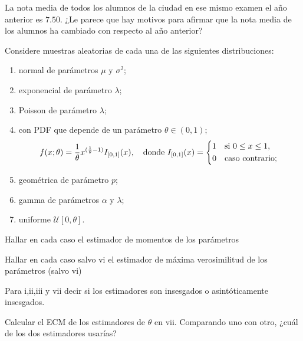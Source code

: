 \documentclass[a4paper,oneside,fleqn,11pt]{article}
\begin{document}
\begin{ejercicios}
\begin{ejitems}
    \item La nota media de todos los alumnos de la ciudad en ese mismo examen el año anterior es $7.50$. ¿Le parece que hay motivos para afirmar que la nota media de los alumnos ha cambiado con respecto al año anterior?
\end{ejitems}



\item
Considere muestras aleatorias de cada una de las siguientes distribuciones:
\begin{enumerate}[label=\roman*]
  \item normal de parámetros $\mu$ y $\sigma^2$;
  \item exponencial de parámetro $\lambda$;
  \item Poisson de parámetro $\lambda$;
  \item con PDF que depende de un parámetro $\theta\in (0,1)$; 
  \begin{align*}
    f(x;\theta) 
    = \frac{1}{\theta}x^{(\frac{1}{\theta}-1)}I_{[0,1]}(x), 
    \quad \text{donde  } 
    I_{[0,1]}(x) = 
    \begin{cases*} 
      1 & si $0 \leq x \leq 1$, \\ 
      0 & caso contrario;
    \end{cases*}
  \end{align*}
  \item geométrica de parámetro $p$;
  \item gamma de parámetros $\alpha$ y $\lambda$;
  \item uniforme $\mathcal{U}[0,\theta]$. 
\end{enumerate}
\begin{ejitems}
  \item Hallar en cada caso el estimador de momentos de los parámetros
  \item Hallar en cada caso salvo vi
el estimador de máxima verosimilitud de los parámetros (salvo vi)
  \item Para i,ii,iii y vii decir si los estimadores son insesgados o 
asintóticamente insesgados.
  \item Calcular el ECM de los estimadores de $\theta$ en vii. Comparando
uno con otro, ¿cuál de los dos estimadores usarías?
\end{ejitems}





\end{ejercicios}
\end{document}
